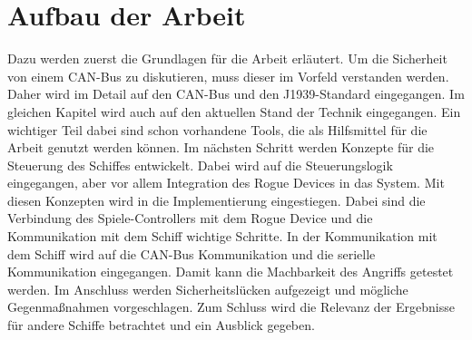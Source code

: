 \section{Aufbau der Arbeit}
Dazu werden zuerst die Grundlagen für die Arbeit erläutert. 
Um die Sicherheit von einem CAN-Bus zu diskutieren, muss dieser im Vorfeld verstanden werden. Daher wird
im Detail auf den CAN-Bus und den J1939-Standard eingegangen.
Im gleichen Kapitel wird auch auf den aktuellen Stand der Technik eingegangen.
Ein wichtiger Teil dabei sind schon vorhandene Tools, die als Hilfsmittel für die Arbeit genutzt werden können.
Im nächsten Schritt werden Konzepte für die Steuerung des Schiffes entwickelt. Dabei wird auf die Steuerungslogik eingegangen, aber
vor allem Integration des Rogue Devices in das System. Mit diesen Konzepten wird in die Implementierung eingestiegen. Dabei sind 
die Verbindung des Spiele-Controllers mit dem Rogue Device und die Kommunikation mit dem Schiff wichtige Schritte.
In der Kommunikation mit dem Schiff wird auf die CAN-Bus Kommunikation und die serielle Kommunikation eingegangen.
Damit kann die Machbarkeit des Angriffs getestet werden. Im Anschluss werden Sicherheitslücken aufgezeigt und mögliche Gegenmaßnahmen
vorgeschlagen. Zum Schluss wird die Relevanz der Ergebnisse für andere Schiffe betrachtet und ein Ausblick gegeben. \\
